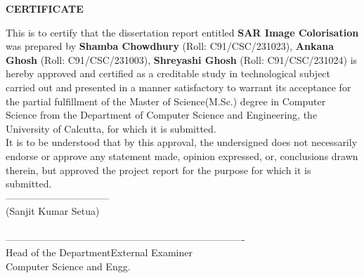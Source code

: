 \begin{center}
    {\large {\bf CERTIFICATE}}
\end{center}

This is to certify that the dissertation report entitled \textbf{SAR Image Colorisation} was prepared by \textbf{Shamba Chowdhury} (Roll: C91/CSC/231023), \textbf{Ankana Ghosh} (Roll: C91/CSC/231003), \textbf{Shreyashi Ghosh} (Roll: C91/CSC/231024) is hereby approved and certified as a creditable study in technological subject carried out and presented in a manner satisfactory to warrant its acceptance for the partial fulfillment of the Master of Science(M.Sc.) degree in Computer Science from the Department of Computer Science and Engineering, the University of Calcutta, for which it is submitted. \\
It is to be understood that by this approval, the undersigned does not necessarily endorse or approve any statement made, opinion expressed, or, conclusions drawn therein, but approved the project report for the purpose for which it is submitted.
\\[.5cm]

\large{--------------------------------}\\
\hspace*{.4in}\large{(Sanjit Kumar Setua)}\\
\hspace*{.5in}\\[1.0cm]

\large{---------------------------------------}\hspace*{1.5in}\large{----------------------------------}\\
\hspace*{.4in}\large{Head of the Department}\hspace*{2.2in}\large{External Examiner}
\\[0.1cm]
\hspace*{.2in}Computer Science and Engg.
